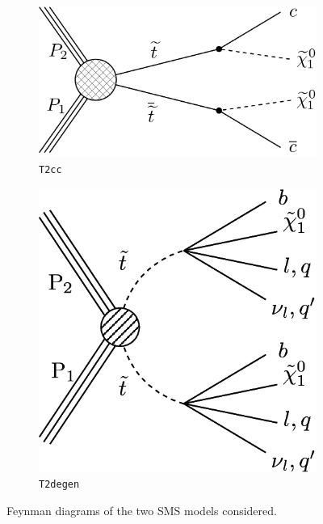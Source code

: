 \begin{figure}[h!]
  \centering
  \begin{subfigure}{0.35\textwidth}
    \includegraphics[width=\textwidth]{Figs/feynman/T2cc_feynman_new.pdf}
    \caption{\texttt{T2cc}}
    \label{fig:t2cc_feyn}
  \end{subfigure}
  \begin{subfigure}{0.35\textwidth}
    \includegraphics[width=\textwidth]{Figs/feynman/T2DegenerateStop_feyn.png}
    \caption{\texttt{T2degen}}
    \label{fig:t2degen_feyn}
  \end{subfigure}
  \caption{Feynman diagrams of the two SMS models considered.}
  \label{fig:model_feynman}
\end{figure}